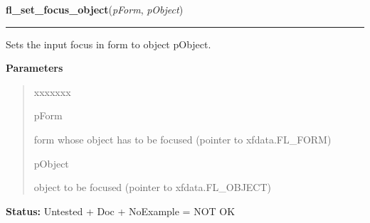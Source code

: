 \hspace{.8\funcindent}\begin{boxedminipage}{\funcwidth}

    \raggedright \textbf{fl\_set\_focus\_object}(\textit{pForm}, \textit{pObject})

    \vspace{-1.5ex}

    \rule{\textwidth}{0.5\fboxrule}
\setlength{\parskip}{2ex}
    Sets the input focus in form to object pObject.

\setlength{\parskip}{1ex}
      \textbf{Parameters}
      \vspace{-1ex}

      \begin{quote}
        \begin{Ventry}{xxxxxxx}

          \item[pForm]

          form whose object has to be focused (pointer to xfdata.FL\_FORM)

          \item[pObject]

          object to be focused (pointer to xfdata.FL\_OBJECT)

        \end{Ventry}

      \end{quote}

\textbf{Status:} Untested + Doc + NoExample = NOT OK



    \end{boxedminipage}

    \label{xformslib:library:fl_set_focus_object}

    \vspace{0.5ex}

